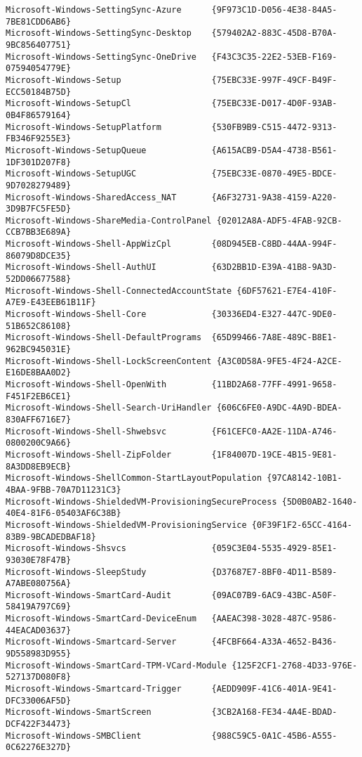\documentclass{report}
\begin{document}
\begin{lstlisting}[breaklines=true,basicstyle=\tiny]
Microsoft-Windows-SettingSync-Azure      {9F973C1D-D056-4E38-84A5-7BE81CDD6AB6}
Microsoft-Windows-SettingSync-Desktop    {579402A2-883C-45D8-B70A-9BC856407751}
Microsoft-Windows-SettingSync-OneDrive   {F43C3C35-22E2-53EB-F169-07594054779E}
Microsoft-Windows-Setup                  {75EBC33E-997F-49CF-B49F-ECC50184B75D}
Microsoft-Windows-SetupCl                {75EBC33E-D017-4D0F-93AB-0B4F86579164}
Microsoft-Windows-SetupPlatform          {530FB9B9-C515-4472-9313-FB346F9255E3}
Microsoft-Windows-SetupQueue             {A615ACB9-D5A4-4738-B561-1DF301D207F8}
Microsoft-Windows-SetupUGC               {75EBC33E-0870-49E5-BDCE-9D7028279489}
Microsoft-Windows-SharedAccess_NAT       {A6F32731-9A38-4159-A220-3D9B7FC5FE5D}
Microsoft-Windows-ShareMedia-ControlPanel {02012A8A-ADF5-4FAB-92CB-CCB7BB3E689A}
Microsoft-Windows-Shell-AppWizCpl        {08D945EB-C8BD-44AA-994F-86079D8DCE35}
Microsoft-Windows-Shell-AuthUI           {63D2BB1D-E39A-41B8-9A3D-52DD06677588}
Microsoft-Windows-Shell-ConnectedAccountState {6DF57621-E7E4-410F-A7E9-E43EEB61B11F}
Microsoft-Windows-Shell-Core             {30336ED4-E327-447C-9DE0-51B652C86108}
Microsoft-Windows-Shell-DefaultPrograms  {65D99466-7A8E-489C-B8E1-962BC945031E}
Microsoft-Windows-Shell-LockScreenContent {A3C0D58A-9FE5-4F24-A2CE-E16DE8BAA0D2}
Microsoft-Windows-Shell-OpenWith         {11BD2A68-77FF-4991-9658-F451F2EB6CE1}
Microsoft-Windows-Shell-Search-UriHandler {606C6FE0-A9DC-4A9D-BDEA-830AFF6716E7}
Microsoft-Windows-Shell-Shwebsvc         {F61CEFC0-AA2E-11DA-A746-0800200C9A66}
Microsoft-Windows-Shell-ZipFolder        {1F84007D-19CE-4B15-9E81-8A3DD8EB9ECB}
Microsoft-Windows-ShellCommon-StartLayoutPopulation {97CA8142-10B1-4BAA-9FBB-70A7D11231C3}
Microsoft-Windows-ShieldedVM-ProvisioningSecureProcess {5D0B0AB2-1640-40E4-81F6-05403AF6C38B}
Microsoft-Windows-ShieldedVM-ProvisioningService {0F39F1F2-65CC-4164-83B9-9BCADEDBAF18}
Microsoft-Windows-Shsvcs                 {059C3E04-5535-4929-85E1-93030E78F47B}
Microsoft-Windows-SleepStudy             {D37687E7-8BF0-4D11-B589-A7ABE080756A}
Microsoft-Windows-SmartCard-Audit        {09AC07B9-6AC9-43BC-A50F-58419A797C69}
Microsoft-Windows-SmartCard-DeviceEnum   {AAEAC398-3028-487C-9586-44EACAD03637}
Microsoft-Windows-Smartcard-Server       {4FCBF664-A33A-4652-B436-9D558983D955}
Microsoft-Windows-SmartCard-TPM-VCard-Module {125F2CF1-2768-4D33-976E-527137D080F8}
Microsoft-Windows-Smartcard-Trigger      {AEDD909F-41C6-401A-9E41-DFC33006AF5D}
Microsoft-Windows-SmartScreen            {3CB2A168-FE34-4A4E-BDAD-DCF422F34473}
Microsoft-Windows-SMBClient              {988C59C5-0A1C-45B6-A555-0C62276E327D}

\end{lstlisting}
\end{document}
